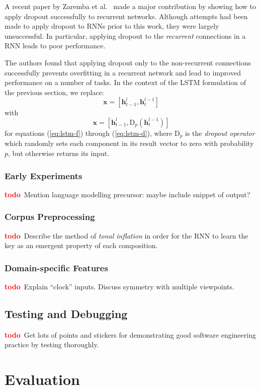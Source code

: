 \documentclass[12pt,a4paper,twoside,openright]{report}
\newcommand{\vect}[1]{\boldsymbol{\mathbf{#1}}}
\newcommand{\todo}{\textcolor{red}{\textbf{todo}~}}
\begin{document}
A recent paper by Zaremba et al.\ \cite{zaremba2014recurrent} made a major
contribution by showing how to apply dropout successfully to recurrent networks.
Although attempts had been made to apply dropout to RNNs prior to this work,
they were largely unsuccessful. In particular, applying dropout to the
\emph{recurrent} connections in a RNN leads to poor performance.

The authors found that applying dropout only to the non-recurrent connections
successfully prevents overfitting in a recurrent network and lead to improved
performance on a number of tasks. In the context of the LSTM formulation of the
previous section, we replace:
$$ \vect{x} = [\vect{h}_{t-1}^l, \vect{h}_t^{l-1}] $$
with
$$ \vect{x} = [\vect{h}_{t-1}^l, \mathrm{D}_p(\vect{h}_t^{l-1})] $$
for equations (\ref{eq:lstm-f}) through (\ref{eq:lstm-d}), where $\mathrm{D}_p$
is the \emph{dropout operator} which randomly sets each component in its result
vector to zero with probability $p$, but otherwise returns its input. 

\subsection{Early Experiments}

\todo Mention language modelling precursor: maybe include snippet of output?

\subsection{Corpus Preprocessing}

\todo Describe the method of \emph{tonal inflation} in order for the RNN to
learn the key as an emergent property of each composition.

\subsection{Domain-specific Features}

\todo Explain ``clock'' inputs. Discuss symmetry with multiple viewpoints.

\section{Testing and Debugging}

\todo Get lots of points and stickers for demonstrating good software
engineering practice by testing thoroughly.

\chapter{Evaluation}\label{chap:eval}
\end{document}
